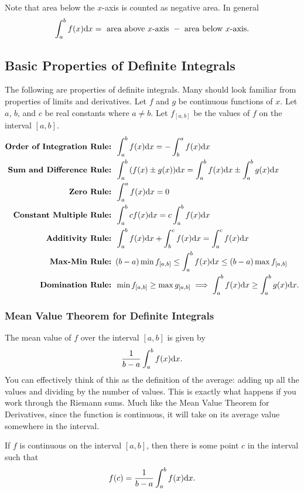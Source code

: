 Note that area below the $x$-axis is counted as negative area.
In general
\begin{equation*}
	\int_{a}^{b}{f(x)\mathrm{d} x} = \text{ area above $x$-axis } - \text{ area below $x$-axis}.
\end{equation*}

\subsection{Basic Properties of Definite Integrals}
The following are properties of definite integrals.
Many should look familiar from properties of limits and derivatives.
Let $f$ and $g$ be continuous functions of $x$.
Let $a$, $b$, and $c$ be real constants where $a \neq b$.
Let $f_{[a,b]}$ be the values of $f$ on the interval $[a,b]$.
\begin{align*}
	\textbf{Order of Integration Rule: }& \int_{a}^{b}{f(x)\mathrm{d} x} = -\int_{b}^{a}{f(x)\mathrm{d} x} \\
	\textbf{Sum and Difference Rule: }& \int_{a}^{b}{(f(x) \pm g(x))\mathrm{d} x} = \int_{a}^{b}{f(x)\mathrm{d} x} \pm \int_{a}^{b}{g(x)\mathrm{d} x} \\
	\textbf{Zero Rule: }& \int_{a}^{a}{f(x)\mathrm{d} x} = 0 \\
	\textbf{Constant Multiple Rule: }& \int_{a}^{b}{cf(x)\mathrm{d} x} = c\int_{a}^{b}{f(x)\mathrm{d} x} \\
	\textbf{Additivity Rule: }& \int_{a}^{b}{f(x)\mathrm{d} x} + \int_{b}^{c}{f(x)\mathrm{d} x} = \int_{a}^{c}{f(x)\mathrm{d} x} \\
	\textbf{Max-Min Rule: }& (b-a)\min{f_{[a,b]}} \leq \int_{a}^{b}{f(x)\mathrm{d} x} \leq (b-a)\max{f_{[a,b]}} \\
	\textbf{Domination Rule: }& \min{f_{[a,b]}} \geq \max{g_{[a,b]}} \implies \int_{a}^{b}{f(x)\mathrm{d} x} \geq \int_{a}^{b}{g(x)\mathrm{d} x}.
\end{align*}

\subsubsection{Mean Value Theorem for Definite Integrals}
The mean value of $f$ over the interval $[a,b]$ is given by
\begin{equation*}
	\frac{1}{b-a}\int_{a}^{b}{f(x)\mathrm{d} x}.
\end{equation*}
You can effectively think of this as the definition of the average: adding up all the values and dividing by the number of values.
This is exactly what happens if you work through the Riemann sums.
Much like the Mean Value Theorem for Derivatives, since the function is continuous, it will take on its average value somewhere in the interval.
\begin{theorem}
	If $f$ is continuous on the interval $[a,b]$, then there is some point $c$ in the interval such that
	\begin{equation*}
		f(c) = \frac{1}{b-a}\int_{a}^{b}{f(x)\mathrm{d} x}.
	\end{equation*}
\end{theorem}

